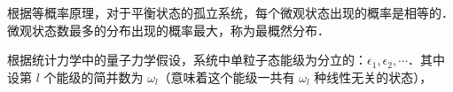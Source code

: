 

根据等概率原理，对于平衡状态的孤立系统，每个微观状态出现的概率是相等的．微观状态数最多的分布出现的概率最大，称为最概然分布．

根据统计力学中的量子力学假设，系统中单粒子态能级为分立的：$\epsilon_1,\epsilon_2,\cdots$．其中设第 $l$ 个能级的简并数为 $\omega_l$（意味着这个能级一共有 $\omega_l$ 种线性无关的状态），